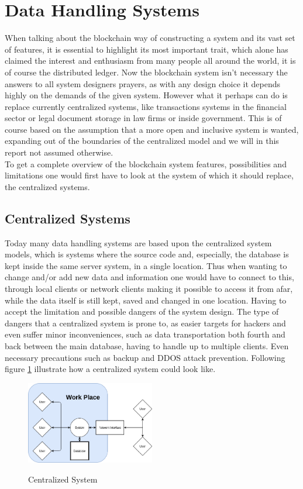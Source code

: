 \documentclass[paper=a4, fontsize=11pt]{scrartcl} %
\numberwithin{equation}{section} %
\numberwithin{figure}{section} %
\numberwithin{table}{section} %
\begin{document}
\section{Data Handling Systems}

When talking about the blockchain way of constructing a system and its vast set of features, it is essential to highlight its most important trait, which alone has claimed the interest and enthusiasm from many people all around the world, it is of course the distributed ledger. Now the blockchain system isn't necessary the answers to all system designers prayers, as with any design choice it depends highly on the demands of the given system. However what it perhaps can do is replace currently centralized systems, like transactions systems in the financial sector or legal document storage in law firms or inside government. This is of course based on the assumption that a more open and inclusive system is wanted, expanding out of the boundaries of the centralized model and we will in this report not assumed otherwise. \\

To get a complete overview of the blockchain system features, possibilities and limitations one would first have to look at the system of which it should replace, the centralized systems.\\

\subsection{Centralized Systems}
Today many data handling systems are based upon the centralized system models, which is systems where the source code and, especially, the database is kept inside the same server system, in a single location. Thus when wanting to change and/or add new data and information one would have to connect to this, through local clients or network clients making it possible to access it from afar, while the data itself is still kept, saved and changed in one location. Having to accept the limitation and possible dangers of the system design. The type of dangers that a centralized system is prone to, as easier targets for hackers and even suffer minor inconveniences, such as data transportation both fourth and back between the main database, having to handle up to multiple clients. Even necessary precautions such as backup and DDOS attack prevention. Following figure \ref{fig:cenSys} illustrate how a centralized system could look like.

\begin{figure}[H]
  \caption{Centralized System}
  \centering
    \includegraphics[width=0.5\textwidth]{CS.png}
  \label{fig:cenSys}	
\end{figure}
\end{document}
